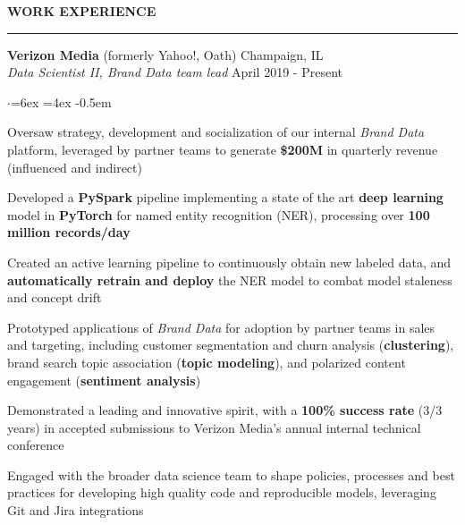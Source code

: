 \documentclass[11pt]{article}
\newenvironment{rSection}[1]{ %
  \sectionskip
  \MakeUppercase{\bf #1} %
  \sectionlineskip
  \hrule %
  \begin{list}{}{ %
    \setlength{\leftmargin}{1.5em} %
  }
  \item[]
}{
  \end{list}
}
\def\sectionlineskip{\smallskip} %
\def\sectionskip{\smallskip} %
\begin{document}
\begin{rSection}{Work Experience}
{\bf Verizon Media} (formerly Yahoo!, Oath) \hfill Champaign, IL \\
{\em \hspace*{2ex} Data Scientist II, Brand Data team lead} \hfill April 2019 - Present

\begin{list}{$\cdot$}{\leftmargin=6ex \rightmargin=4ex} %
   \itemsep -0.5em \vspace{-0.5em} %
   \item Oversaw strategy, development and socialization of our internal \textit{Brand Data} platform, leveraged by partner teams to generate \textbf{\$200M} in quarterly revenue (influenced and indirect)
   \item Developed a \textbf{PySpark} pipeline implementing a state of the art \textbf{deep learning} model in \textbf{PyTorch} for named entity recognition (NER), processing over \textbf{100 million records/day}
   \item Created an active learning pipeline to continuously obtain new labeled data, and \textbf{automatically retrain and deploy} the NER model to combat model staleness and concept drift
   \item Prototyped applications of \textit{Brand Data} for adoption by partner teams in sales and targeting, including customer segmentation and churn analysis (\textbf{clustering}), brand search topic association (\textbf{topic modeling}), and polarized content engagement (\textbf{sentiment analysis})
   \item Demonstrated a leading and innovative spirit, with a \textbf{100\% success rate} (3/3 years) in accepted submissions to Verizon Media's annual internal technical conference
   \item Engaged with the broader data science team to shape policies, processes and best practices for developing high quality code and reproducible models, leveraging Git and Jira integrations
\end{list}


\end{rSection}
\end{document}
